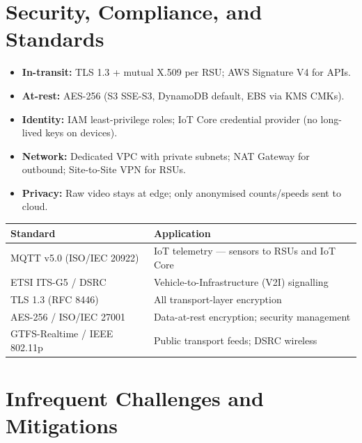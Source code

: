 \documentclass[11pt,a4paper]{article}
\begin{document}
\section{Security, Compliance, and Standards}

\begin{itemize}
  \item \textbf{In-transit:} TLS 1.3 + mutual X.509 per RSU; AWS Signature V4 for APIs.
  \item \textbf{At-rest:} AES-256 (S3 SSE-S3, DynamoDB default, EBS via KMS CMKs).
  \item \textbf{Identity:} IAM least-privilege roles; IoT Core credential provider (no long-lived keys on devices).
  \item \textbf{Network:} Dedicated VPC with private subnets; NAT Gateway for outbound; Site-to-Site VPN for RSUs.
  \item \textbf{Privacy:} Raw video stays at edge; only anonymised counts/speeds sent to cloud.
\end{itemize}

\vspace{3pt}
\renewcommand{\arraystretch}{1.2}
\begin{center}
\begin{tabular}{|L{4cm}|L{7.5cm}|}
\hline
\textbf{Standard} & \textbf{Application} \\
\hline
MQTT v5.0 (ISO/IEC 20922) & IoT telemetry — sensors to RSUs and IoT Core \\
\hline
ETSI ITS-G5 / DSRC & Vehicle-to-Infrastructure (V2I) signalling \\
\hline
TLS 1.3 (RFC 8446) & All transport-layer encryption \\
\hline
AES-256 / ISO/IEC 27001 & Data-at-rest encryption; security management \\
\hline
GTFS-Realtime / IEEE 802.11p & Public transport feeds; DSRC wireless \\
\hline
\end{tabular}
\end{center}

\section{Infrequent Challenges and Mitigations}
\end{document}
